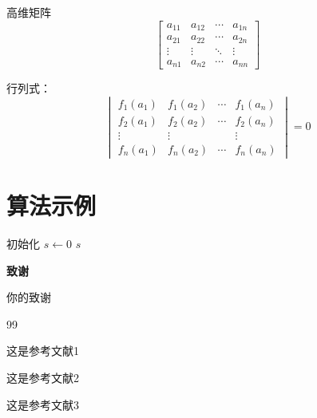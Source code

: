 \documentclass[a4paper,AutoFakeBold={2.7},UTF8,zihao=5,twoside]{ctexart} %
\numberwithin{equation}{section}%
\begin{document}
高维矩阵
\begin{equation}
	\begin{bmatrix}
		a_{11} & a_{12} & \cdots & a_{1n} \\
		a_{21} & a_{22} & \cdots & a_{2n} \\
		\vdots & \vdots & \ddots & \vdots \\
		a_{n1} & a_{n2} & \cdots & a_{nn}
	\end{bmatrix}
\end{equation}

行列式：
\begin{equation}
  \begin{vmatrix}
    f_1(a_1) & f_1(a_2) & \cdots & f_1(a_n) \\
    f_2(a_1) & f_2(a_2) & \cdots & f_2(a_n) \\
    \vdots   & \vdots   &        & \vdots   \\
    f_n(a_1) & f_n(a_2) & \cdots & f_n(a_n)
  \end{vmatrix}
  = 0
\end{equation}

\clearpage

\section{算法示例}

\begin{algorithm}
\caption{累加求和算法}

初始化 $s \gets 0$\;
\Return $s$\;
\end{algorithm}

\clearpage

\begin{center}
	\songti\bfseries 致\quad 谢
\end{center}

你的致谢

\clearpage

\begingroup%
\begin{thebibliography}{99}
	这是参考文献1
	
	这是参考文献2
	
	这是参考文献3
\end{thebibliography}
\endgroup
\end{document}
